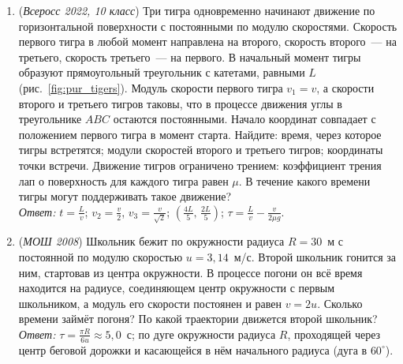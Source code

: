 \documentclass[../main.tex]{subfiles}
\begin{document}
\begin{enumerate}

  \item (\textit{Всеросс 2022, 10 класс}) Три тигра одновременно начинают движение по
  горизонтальной поверхности с постоянными по модулю скоростями. Скорость первого тигра
  в любой момент направлена на второго, скорость второго~--- на третьего, скорость
  третьего~--- на первого. В начальный момент тигры образуют прямоугольный треугольник
  с катетами, равными $L$ (рис.~\ref{fig:pur_tigers}). Модуль скорости первого тигра
  $v_1 = v$, а скорости второго и третьего тигров таковы, что в процессе движения углы
  в треугольнике $ABC$ остаются постоянными. Начало координат совпадает с положением
  первого тигра в момент старта. Найдите: время, через которое тигры встретятся;
  модули скоростей второго и третьего тигров; координаты точки встречи. Движение тигров
  ограничено трением: коэффициент трения лап о поверхность для каждого тигра равен
  $\mu$. В течение какого времени тигры могут поддерживать такое движение?\\
  \textit{Ответ:} $t = \frac{L}{v}$; $v_2 = \frac{v}{2}$, $v_3 = \frac{v}{\sqrt{2}}$;
  $\left(\frac{4L}{5},\, \frac{2L}{5}\right)$; $\tau = \frac{L}{v} - \frac{v}{2\mu g}$.


  \item (\textit{МОШ 2008}) Школьник бежит по окружности радиуса $R = 30$~м с
  постоянной по модулю скоростью $u = 3{,}14$~м/с. Второй школьник гонится за ним,
  стартовав из центра окружности. В процессе погони он всё время находится на
  радиусе, соединяющем центр окружности с первым школьником, а модуль его скорости
  постоянен и равен $v = 2u$. Сколько времени займёт погоня? По какой траектории
  движется второй школьник?\\
  \textit{Ответ:} $\tau = \frac{\pi R}{6u} \approx 5{,}0$~с; по дуге окружности радиуса
  $R$, проходящей через центр беговой дорожки и касающейся в нём начального радиуса
  (дуга в $60^\circ$).


\end{enumerate}
\end{document}
